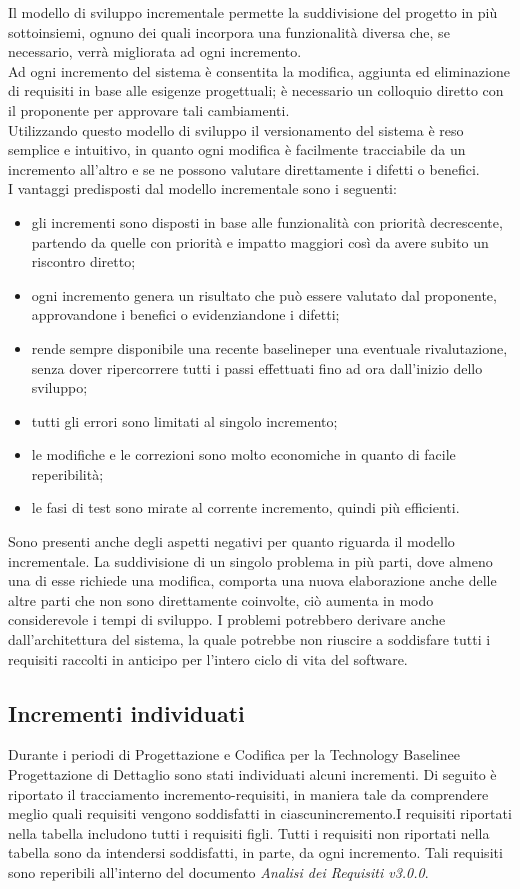 Il modello di sviluppo incrementale permette la suddivisione del progetto in più sottoinsiemi,
ognuno dei quali incorpora una funzionalità diversa che, se necessario, verrà migliorata ad ogni incremento.  \\
Ad ogni incremento del sistema è consentita la modifica, aggiunta ed eliminazione di requisiti in base alle esigenze progettuali; 
è necessario un colloquio diretto con il proponente per approvare tali cambiamenti. \\
Utilizzando questo modello di sviluppo il versionamento del sistema è reso semplice e intuitivo, in quanto ogni modifica è facilmente tracciabile da un incremento all'altro e se ne possono valutare direttamente i difetti o benefici.\\
I vantaggi predisposti dal modello incrementale sono i seguenti:
\begin{itemize}
	\item gli incrementi sono disposti in base alle funzionalità con priorità decrescente, partendo da quelle con priorità e impatto maggiori
	così da avere subito un riscontro diretto;
	\item ogni incremento genera un risultato che può essere valutato dal proponente, approvandone i benefici o evidenziandone i difetti;
	\item rende sempre disponibile una recente baseline\glosp per una eventuale rivalutazione, senza dover ripercorrere tutti i passi effettuati fino ad ora dall'inizio dello sviluppo;
	\item tutti gli errori sono limitati al singolo incremento;
	\item le modifiche e le correzioni sono molto economiche in quanto di facile reperibilità;
	\item le fasi di test sono mirate al corrente incremento, quindi più efficienti.
\end{itemize}
Sono presenti anche degli aspetti negativi per quanto riguarda il modello incrementale. La suddivisione di un singolo problema in più parti, dove almeno una di esse richiede una modifica, comporta una nuova elaborazione anche delle altre parti che non sono direttamente coinvolte, ciò aumenta in modo considerevole i tempi di sviluppo.
I problemi potrebbero derivare anche dall'architettura del sistema, la quale potrebbe non riuscire a soddisfare tutti i requisiti raccolti in anticipo per l'intero ciclo di vita del software.

\subsection{Incrementi individuati}
Durante i periodi di Progettazione e Codifica per la Technology Baseline\glosp e Progettazione di Dettaglio sono stati individuati alcuni incrementi. Di seguito è riportato il tracciamento incremento-requisiti, in maniera tale da comprendere meglio quali requisiti vengono soddisfatti in ciascunincremento.I requisiti riportati nella tabella includono tutti i requisiti figli. Tutti i requisiti non riportati nella tabella sono da intendersi soddisfatti, in parte, da ogni incremento. Tali requisiti sono reperibili all’interno del documento \textit{Analisi dei Requisiti v3.0.0}.


